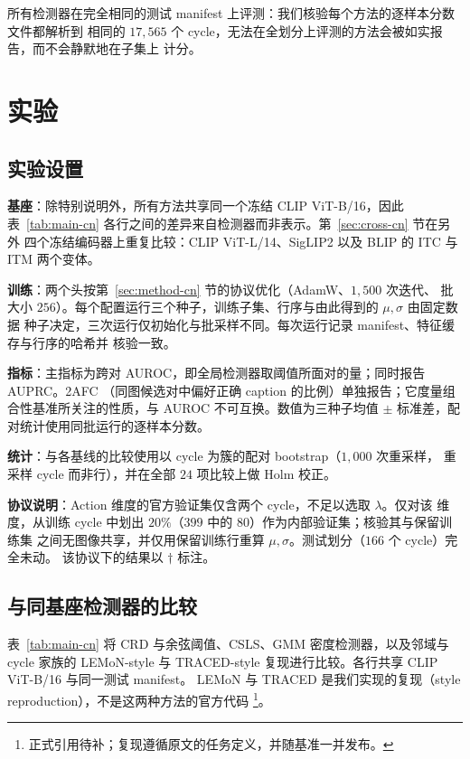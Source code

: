 \documentclass[10pt,twocolumn,a4paper]{ctexart}
\begin{document}
所有检测器在完全相同的测试 manifest 上评测：我们核验每个方法的逐样本分数文件都解析到
相同的 $17{,}565$ 个 cycle，无法在全划分上评测的方法会被如实报告，而不会静默地在子集上
计分。

\section{实验}
\label{sec:exp-cn}

\subsection{实验设置}
\textbf{基座}：除特别说明外，所有方法共享同一个冻结 CLIP ViT-B/16，因此
表~\ref{tab:main-cn} 各行之间的差异来自检测器而非表示。第~\ref{sec:cross-cn} 节在另外
四个冻结编码器上重复比较：CLIP ViT-L/14、SigLIP2 以及 BLIP 的 ITC 与 ITM 两个变体。

\textbf{训练}：两个头按第~\ref{sec:method-cn} 节的协议优化（AdamW、$1{,}500$ 次迭代、
批大小 $256$）。每个配置运行三个种子，训练子集、行序与由此得到的 $\mu,\sigma$ 由固定数据
种子决定，三次运行仅初始化与批采样不同。每次运行记录 manifest、特征缓存与行序的哈希并
核验一致。

\textbf{指标}：主指标为跨对 AUROC，即全局检测器取阈值所面对的量；同时报告 AUPRC。2AFC
（同图候选对中偏好正确 caption 的比例）单独报告；它度量组合性基准所关注的性质，与 AUROC
不可互换。数值为三种子均值 $\pm$ 标准差，配对统计使用同批运行的逐样本分数。

\textbf{统计}：与各基线的比较使用以 cycle 为簇的配对 bootstrap（$1{,}000$ 次重采样，
重采样 cycle 而非行），并在全部 $24$ 项比较上做 Holm 校正。

\textbf{协议说明}：Action 维度的官方验证集仅含两个 cycle，不足以选取 $\lambda$。仅对该
维度，从训练 cycle 中划出 $20\%$（$399$ 中的 $80$）作为内部验证集；核验其与保留训练集
之间无图像共享，并仅用保留训练行重算 $\mu,\sigma$。测试划分（$166$ 个 cycle）完全未动。
该协议下的结果以 $\dagger$ 标注。

\subsection{与同基座检测器的比较}
表~\ref{tab:main-cn} 将 CRD 与余弦阈值、CSLS、GMM 密度检测器，以及邻域与 cycle 家族的
LEMoN-style 与 TRACED-style 复现进行比较。各行共享 CLIP ViT-B/16 与同一测试 manifest。
LEMoN 与 TRACED 是我们实现的复现（style reproduction），不是这两种方法的官方代码
\footnote{正式引用待补；复现遵循原文的任务定义，并随基准一并发布。}。
\end{document}

